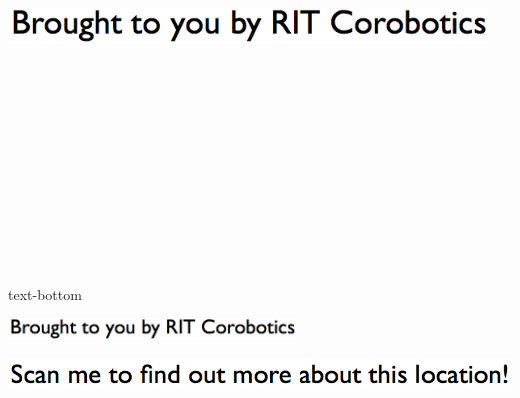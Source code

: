 \documentclass[letterpaper]{article}
\begin{document}
 \begingroup 
 \centerline{\includegraphics[scale=1,width=5in,height=5in]{text-bottom.png}} 
 \endgroup 
 \vspace*{\fill} 

 \hfill{\small text-bottom} 

  \vspace{0.7in} 
 
 \centerline{\includegraphics[scale=1,width=3in]{text-bottom.png}} 
 
 \pagebreak 
{} 
 \vspace*{\fill} 
 
  \centerline{\includegraphics[scale=1,width=6in]{text-top.png}} 
 
 \vspace{0.5in} 
 
\end{document}
